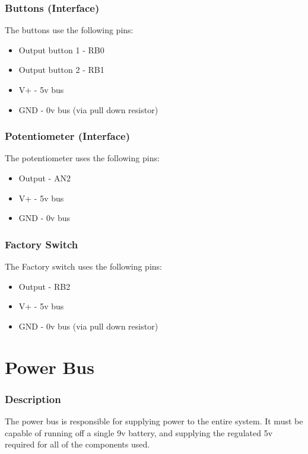 \documentclass[]{report}
\begin{document}
\subsection{Buttons (Interface)}
The buttons use the following pins:
\begin{itemize}
	\item Output button 1 - RB0
	\item Output button 2 - RB1 
	\item V+ - 5v bus
	\item GND - 0v bus (via pull down resistor)
\end{itemize}

\subsection{Potentiometer (Interface)}
The potentiometer uses the following pins:
\begin{itemize}
	\item Output - AN2 
	\item V+ - 5v bus
	\item GND - 0v bus
\end{itemize}

\subsection{Factory Switch}
The Factory switch uses the following pins:
\begin{itemize}
	\item Output - RB2
	\item V+ - 5v bus
	\item GND - 0v bus (via pull down resistor)
\end{itemize}

\chapter{Power Bus}
\subsection{Description}
The power bus is responsible for supplying power to the entire system. It must be capable of running off a single 9v battery, and supplying the regulated 5v required for all of the components used.
\end{document}
